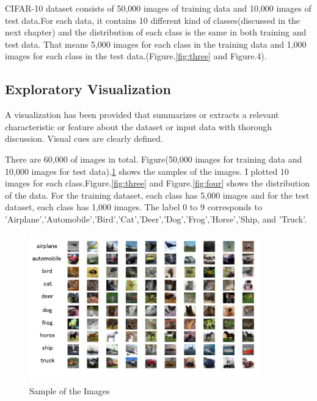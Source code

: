 \documentclass[a4paper,10pt,fleqn]{article}
\begin{document}
CIFAR-10 dataset consists of 50,000 images of training data and 10,000 images of test data.For each data, it contains 10 different kind of classes(discussed in the next chapter) and the distribution of each class is the same in both training and test data. That means 5,000 images for each class in the training data and 1,000 images for each class in the test data.(Figure.\ref{fig:three} and Figure.4). 


\subsection{Exploratory Visualization}
A visualization has been provided that summarizes or extracts a relevant characteristic or feature about the dataset or input data with thorough discussion. Visual cues are clearly defined.


There are 60,000 of images in total. Figure(50,000 images for training data and 10,000 images for test data).\ref{fig:two} shows the samples of the images. I plotted 10 images for each class.Figure.\ref{fig:three} and Figure.\ref{fig:four} shows the distribution of the data. For the training dataset, each class has 5,000 images and for the test dataset, each class has 1,000 images.
The label 0 to 9 corresponds to 'Airplane','Automobile','Bird','Cat','Deer','Dog','Frog','Horse','Ship, and 'Truck'.
\begin{figure}[htbp]

\begin{center}
\includegraphics[width=10cm]{picture/random_sample.png}
\end{center}
\caption{Sample of the Images}
\label{fig:two}

\end{figure}
\end{document}
